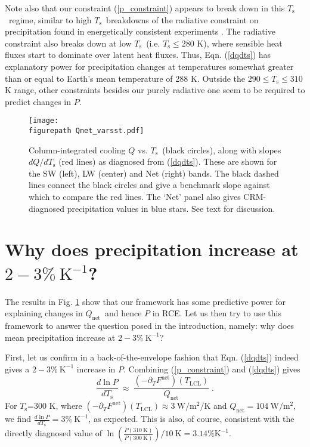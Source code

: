 \documentclass[9pt,twocolumn,twoside,lineno]{pnas-new}
\newcommand{\beqn}{\begin{equation}}
\newcommand{\eeqn}{\end{equation}}
\newcommand{\eqnref}[1]{(\ref{#1})}
\newcommand{\ppt}{\ensuremath{\partial_T}}
\newcommand{\Qnet}{\ensuremath{Q_\mathrm{net}}}
\newcommand{\Fnet}{\ensuremath{F^\mathrm{net}}}
\newcommand{\Wmsq}{\ensuremath{\mathrm{W/m^2}}}
\newcommand{\Kinverse}{\ensuremath{\mathrm{K^{-1}}}}
\newcommand{\Kelvin}{\ensuremath{\mathrm{K}}}
\newcommand{\Ts}{\ensuremath{T_\mathrm{s}}}
\newcommand{\Tlcl}{\ensuremath{T_\mathrm{LCL}}}
\newcommand{\figurepath}{../../figures/}
\begin{document}
Note also that our constraint \eqnref{p_constraint} appears to break down in this \Ts\ regime, similar to high \Ts\ breakdowns of the radiative constraint on precipitation found in energetically consistent experiments \cite{lehir2009, pierrehumbert2002}.  The radiative  constraint  also breaks down at low \Ts\ (i.e. $\Ts \leq 280$ K), where sensible heat fluxes start to dominate over latent heat fluxes. Thus, Eqn. \eqnref{dqdts} has explanatory power for  precipitation changes at  temperatures somewhat greater than or equal to Earth's mean temperature of 288 K. Outside the $290\leq \Ts \leq 310$ K range, other constraints besides our purely radiative one seem to be required to predict changes in $P$.

\begin{figure}[t]
	\begin{center}
			\texttt{[image: \\figurepath Qnet\_varsst.pdf]}
		\caption{Column-integrated cooling $Q$ vs. \Ts\ (black circles), along with slopes $d Q/d \Ts$ (red lines) as diagnosed from \eqnref{dqdts}. These are shown for the SW (left), LW (center) and Net (right) bands.  The black dashed lines connect the black circles and give a benchmark slope against which to compare the red lines. The `Net' panel also gives CRM-diagnosed precipitation values in blue stars. See text for discussion.
		\label{Qnet_varsst}
		}
	\end{center}
\end{figure}



\section{Why does precipitation increase at $2 -3\%\ \Kinverse$?} \label{sec_1percent}
The results in Fig. \ref{Qnet_varsst} show that our framework  has some predictive power for explaining changes in \Qnet\ and hence $P$ in RCE. Let us then try to use this framework to answer the question posed in the introduction, namely: why does mean precipitation increase at $2 -3\%\ \Kinverse$?

First, let us confirm in a back-of-the-envelope fashion that Eqn. \eqnref{dqdts} indeed gives a $2 -3\%\ \Kinverse$ increase in $P$. Combining \eqnref{p_constraint} and \eqnref{dqdts} gives
	\beqn
		\frac{d \ln  P}{d \Ts} \ \approx\  \frac{(-\ppt \Fnet)(\Tlcl)}{\Qnet} \; .
	\label{precip_estimate}
	\eeqn
For \Ts=300 K, where $(-\ppt \Fnet)(\Tlcl) \approx 3 \ \Wmsq/\mathrm{K}$ and $\Qnet =  104\ \Wmsq$, we find $\frac{d \ln  P}{d \Ts}=  3\%\ \Kinverse$, as expected.  This is also, of course, consistent with the directly diagnosed value of $\ln\left(\frac{P(310\ \Kelvin)}{P(300\ \Kelvin)}\right)/10\ \Kelvin = 3.14 \% \Kinverse$.
\end{document}
